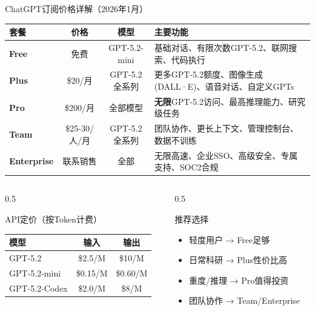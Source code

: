 \documentclass[aspectratio=169,11pt]{beamer}
\begin{document}
\begin{frame}{ChatGPT订阅价格详解（2026年1月）}
    \centering
    \small
    \begin{tabular}{l|c|c|p{6.5cm}}
        \toprule
        \textbf{套餐} & \textbf{价格} & \textbf{模型} & \textbf{主要功能} \\
        \midrule
        \rowcolor{gray!10}
        \textbf{Free} & 免费 & GPT-5.2-mini & 基础对话、有限次数GPT-5.2、联网搜索、代码执行 \\
        \midrule
        \textbf{Plus} & \$20/月 & GPT-5.2全系列 & 更多GPT-5.2额度、图像生成(DALL·E)、语音对话、自定义GPTs \\
        \midrule
        \rowcolor{blue!10}
        \textbf{Pro} & \$200/月 & 全部模型 & \textbf{无限}GPT-5.2访问、最高推理能力、研究级任务 \\
        \midrule
        \textbf{Team} & \$25-30/人/月 & GPT-5.2全系列 & 团队协作、更长上下文、管理控制台、数据不训练 \\
        \midrule
        \rowcolor{yellow!10}
        \textbf{Enterprise} & 联系销售 & 全部 & 无限高速、企业SSO、高级安全、专属支持、SOC2合规 \\
        \bottomrule
    \end{tabular}
    
    \vspace{0.4cm}
    \begin{columns}
        \begin{column}{0.5\textwidth}
            \begin{block}{API定价（按Token计费）}
                \footnotesize
                \begin{tabular}{lcc}
                    模型 & 输入 & 输出 \\
                    \hline
                    GPT-5.2 & \$2.5/M & \$10/M \\
                    GPT-5.2-mini & \$0.15/M & \$0.60/M \\
                    GPT-5.2-Codex & \$2.0/M & \$8/M \\
                \end{tabular}
            \end{block}
        \end{column}
        \begin{column}{0.5\textwidth}
            \begin{exampleblock}{推荐选择}
                \footnotesize
                \begin{itemize}
                    \item 轻度用户 → Free足够
                    \item 日常科研 → Plus性价比高
                    \item 重度/推理 → Pro值得投资
                    \item 团队协作 → Team/Enterprise
                \end{itemize}
            \end{exampleblock}
        \end{column}
    \end{columns}
\end{frame}
\end{document}

